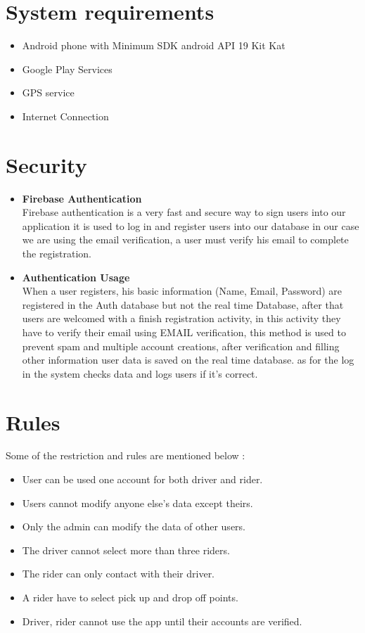 \section{System requirements}
\begin{itemize}
\item Android phone with Minimum SDK android API 19 Kit Kat 
\item Google Play Services
\item GPS service
\item Internet Connection
\end{itemize}

\section{Security}
\begin{itemize}
\item \textbf{Firebase Authentication}\\ 

Firebase authentication is a very fast and secure way to sign users into our application it is used to log in and register users into our database in our case we are using the email verification, a user must verify his email to complete the registration.

\item \textbf{Authentication Usage}\\

When a user registers, his basic information (Name, Email, Password) are registered in the Auth database but not the real time Database, after that users are welcomed with a finish registration activity, in this activity they have to verify their email using EMAIL verification, this method is used to prevent spam and multiple account creations, after verification and filling other information user data is saved on the real time database. as for the log in the system checks data and logs users if it’s correct.
\end{itemize}

\section{Rules}
Some of the restriction and rules are mentioned below :
\begin{itemize}
\item User can be used one account for both driver and rider.
\item Users cannot modify anyone else’s data except theirs.
\item Only the admin can modify the data of other users.
\item The driver cannot select more than three riders.
\item The rider can only contact with their driver.
\item A rider have to select pick up and drop off points.
\item Driver, rider cannot use the app until their accounts are verified.
\end{itemize}
